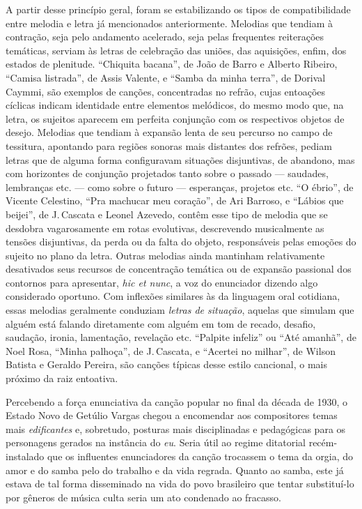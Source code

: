 A partir desse princípio geral, foram se estabilizando os tipos de
compatibilidade entre melodia e letra já mencionados anteriormente.
Melodias que tendiam à contração, seja pelo andamento acelerado, seja
pelas frequentes reiterações temáticas, serviam às letras de celebração
das uniões, das aquisições, enfim, dos estados de plenitude. ``Chiquita
bacana'', de João de Barro e Alberto Ribeiro, ``Camisa listrada'', de Assis
Valente, e ``Samba da minha terra'', de Dorival Caymmi, são exemplos de
canções, concentradas no refrão, cujas entoações cíclicas indicam
identidade entre elementos melódicos, do mesmo modo que, na letra, os
sujeitos aparecem em perfeita conjunção com os respectivos objetos de
desejo. Melodias que tendiam à expansão lenta de seu percurso no campo
de tessitura, apontando para regiões sonoras mais distantes dos refrões,
pediam letras que de alguma forma configuravam situações disjuntivas, de
abandono, mas com horizontes de conjunção projetados tanto sobre o
passado --- saudades, lembranças etc. --- como sobre o futuro --- esperanças,
projetos etc. ``O ébrio'', de Vicente Celestino, ``Pra machucar meu
coração'', de Ari Barroso, e ``Lábios que beijei'', de J.\,Cascata e Leonel
Azevedo, contêm esse tipo de melodia que se desdobra vagarosamente em
rotas evolutivas, descrevendo musicalmente as tensões disjuntivas, da
perda ou da falta do objeto, responsáveis pelas emoções do sujeito no
plano da letra. Outras melodias ainda mantinham relativamente
desativados seus recursos de concentração temática ou de expansão
passional dos contornos para apresentar, \textit{hic et nunc}, a voz do
enunciador dizendo algo considerado oportuno. Com inflexões similares às
da linguagem oral cotidiana, essas melodias geralmente conduziam
\textit{letras de situação}, aquelas que simulam que alguém está falando
diretamente com alguém em tom de recado, desafio, saudação, ironia,
lamentação, revelação etc. ``Palpite infeliz'' ou ``Até amanhã'', de Noel
Rosa, ``Minha palhoça'', de J.\,Cascata, e ``Acertei no milhar'', de Wilson
Batista e Geraldo Pereira, são canções típicas desse estilo cancional, o
mais próximo da raiz entoativa.

Percebendo a força enunciativa da canção popular no final da década de
1930, o Estado Novo de Getúlio Vargas chegou a encomendar aos
compositores temas mais \textit{edificantes} e, sobretudo, posturas mais
disciplinadas e pedagógicas para os personagens gerados na instância do
\textit{eu}. Seria útil ao regime ditatorial recém-instalado que os
influentes enunciadores da canção trocassem o tema da orgia, do amor e
do samba pelo do trabalho e da vida regrada. Quanto ao samba, este já
estava de tal forma disseminado na vida do povo brasileiro que tentar
substituí-lo por gêneros de música culta seria um ato condenado ao
fracasso.

